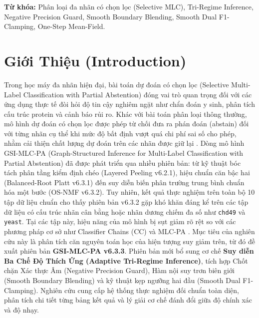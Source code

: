 \documentclass[10pt,a4paper,twoside]{article}
\begin{document}
\vspace{0.5em}
\noindent\textbf{Từ khóa:} Phân loại đa nhãn có chọn lọc (Selective MLC), Tri-Regime Inference, Negative Precision Guard, Smooth Boundary Blending, Smooth Dual F1-Clamping, One-Step Mean-Field.

\section{Giới Thiệu (Introduction)}
Trong học máy đa nhãn hiện đại, bài toán dự đoán có chọn lọc (Selective Multi-Label Classification with Partial Abstention) đóng vai trò quan trọng đối với các ứng dụng thực tế đòi hỏi độ tin cậy nghiêm ngặt như chẩn đoán y sinh, phân tích cấu trúc protein và cảnh báo rủi ro. Khác với bài toán phân loại thông thường, mô hình dự đoán có chọn lọc được phép từ chối đưa ra phán đoán (abstain) đối với từng nhãn cụ thể khi mức độ bất định vượt quá chi phí sai số cho phép, nhằm cải thiện chất lượng dự đoán trên các nhãn được giữ lại \cite{chow1970, nguyen2021}.
Dòng mô hình GSI-MLC-PA (Graph-Structured Inference for Multi-Label Classification with Partial Abstention) đã được phát triển qua nhiều phiên bản: từ kỹ thuật bóc tách phân tầng kiểm định chéo (Layered Peeling v6.2.1), hiệu chuẩn căn bậc hai (Balanced-Root Platt v6.3.1) đến suy diễn biến phân trường trung bình chuẩn hóa một bước (OS-NMF v6.3.2). Tuy nhiên, kết quả thực nghiệm trên toàn bộ 10 tập dữ liệu chuẩn cho thấy phiên bản v6.3.2 gặp khó khăn đáng kể trên các tập dữ liệu có cấu trúc nhãn cân bằng hoặc nhãn dương chiếm đa số như \texttt{chd49} và \texttt{yeast}. Tại các tập này, hiệu năng của mô hình bị sụt giảm rõ rệt so với các phương pháp cơ sở như Classifier Chains (CC) \cite{read2011} và MLC-PA \cite{nguyen2021}.
Mục tiêu của nghiên cứu này là phân tích căn nguyên toán học của hiện tượng suy giảm trên, từ đó đề xuất phiên bản \textbf{GSI-MLC-PA v6.3.3}. Phiên bản mới bổ sung cơ chế \textbf{Suy diễn Ba Chế Độ Thích Ứng (Adaptive Tri-Regime Inference)}, tích hợp Chốt chặn Xác thực Âm (Negative Precision Guard), Hàm nội suy trơn biên giới (Smooth Boundary Blending) và kỹ thuật kẹp ngưỡng hai đầu (Smooth Dual F1-Clamping). Nghiên cứu cung cấp hệ thống thực nghiệm đối chuẩn toàn diện, phân tích chi tiết từng bảng kết quả và lý giải cơ chế đánh đổi giữa độ chính xác và độ nhạy.
\end{document}
